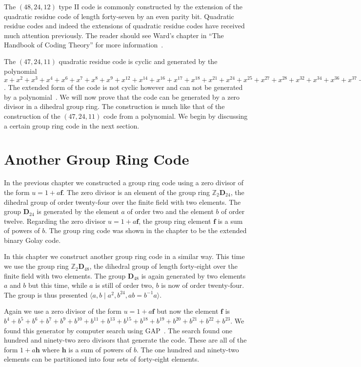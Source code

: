 The $(48,24,12)$ type II code is commonly constructed by the extension of the quadratic residue code of length forty-seven by an even parity bit.
Quadratic residue codes and indeed the extensions of quadratic residue codes have received much attention previously.
The reader should see Ward's chapter in ``The Handbook of Coding Theory'' for more information~\cite[p.~827]{han98a}.

The $(47,24,11)$ quadratic residue code is cyclic and generated by the polynomial $x+x^2+x^3+x^4+x^6+x^7+x^8+x^9+x^{12}+x^{14}+x^{16}+x^{17}+x^{18}+x^{21}+x^{24}+x^{25}+x^{27}+x^{28}+x^{32}+x^{34}+x^{36}+x^{37}+x^{42}$.
The extended form of the code is not cyclic however and can not be generated by a polynomial~\cite{slo83}.
We will now prove that the code can be generated by a zero divisor in a dihedral group ring.
The construction is much like that of the construction of the $(47,24,11)$ code from a polynomial.
We begin by discussing a certain group ring code in the next section.

\section{Another Group Ring Code}
In the previous chapter we constructed a group ring code using a zero divisor of the form $u=1+a \mathbf{f}$.
The zero divisor is an element of the group ring $\mathbb{Z}_2 \mathbf{D}_{24}$, the dihedral group of order twenty-four over the finite field with two elements.
The group $\mathbf{D}_{24}$ is generated by the element $a$ of order two and the element $b$ of order twelve.
Regarding the zero divisor $u= 1 + a \mathbf{f}$, the group ring element $\mathbf{f}$ is a sum of powers of $b$.
The group ring code was shown in the chapter to be the extended binary Golay code.

In this chapter we construct another group ring code in a similar way.
This time we use the group ring $\mathbb{Z}_2 \mathbf{D}_{48}$, the dihedral group of length forty-eight over the finite field with two elements.
The group $\mathbf{D}_{48}$ is again generated by two elements $a$ and $b$ but this time, while $a$ is still of order two, $b$ is now of order twenty-four.
The group is thus presented $\langle a , b \mid a^2 , b^{24} , ab = b^{-1}a \rangle$.

Again we use a zero divisor of the form $u=1+a \mathbf{f}$ but now the element $\mathbf{f}$ is $b^4 + b^5 + b^6 + b^7 + b^9 + b^{10} + b^{11} + b^{13} + b^{15} + b^{18} + b^{19} + b^{20} + b^{21} + b^{22} + b^{23}$.
We found this generator by computer search using GAP~\cite{gap06}.
The search found one hundred and ninety-two zero divisors that generate the code.
These are all of the form $1+ a \mathbf{h}$ where $\mathbf{h}$ is a sum of powers of $b$.
The one hundred and ninety-two elements can be partitioned into four sets of forty-eight elements.

